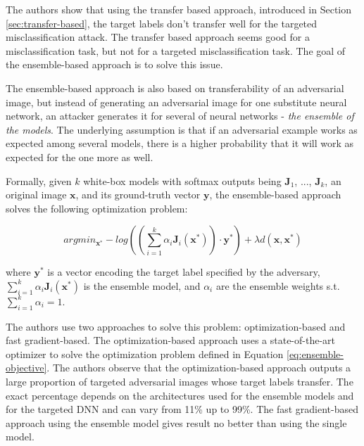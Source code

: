 The authors \cite{ensemble-attack} show that using the transfer based approach, introduced in Section \ref{sec:transfer-based}, the target labels don't transfer well for the targeted misclassification attack. The transfer based approach seems good for a misclassification task, but not for a targeted misclassification task. The goal of the ensemble-based approach is to solve this issue.

The ensemble-based approach is also based on transferability of an adversarial image, but instead of generating an adversarial image for one substitute neural network, an attacker generates it for several of neural networks - \textit{the ensemble of the models}. The underlying assumption is that if an adversarial example works as expected among several models, there is a higher probability that it will work as expected for the one more as well. 

Formally, given $k$ white-box models with softmax outputs being $\pmb J_1$, ..., $\pmb J_k$, an original image $\pmb x$, and its ground-truth vector $\pmb y$, the ensemble-based approach solves the following optimization problem:

\begin{equation}\label{eq:ensemble-objective}
argmin_{\pmb x^*} - log ((\sum_{i=1}^k \alpha_i \pmb J_i(\pmb x^*)) \cdot \pmb y^*) + \lambda d(\pmb x, \pmb x^*)
\end{equation}

where $\pmb y^*$ is a vector encoding the target label specified by the adversary, $\sum_{i=1}^k \alpha_i \pmb J_i(\pmb x^*)$ is the ensemble model, and $\alpha_i$ are the ensemble weights s.t. $\sum_{i=1}^k \alpha_i = 1$.

The authors use two approaches to solve this problem: optimization-based and fast gradient-based. The optimization-based approach uses a state-of-the-art optimizer to solve the optimization problem defined in Equation \ref{eq:ensemble-objective}. The authors observe that the optimization-based approach outputs a large proportion of targeted adversarial images whose target labels transfer. The exact percentage depends on the architectures used for the ensemble models and for the targeted DNN and can vary from 11\% up to 99\%. The fast gradient-based approach using the ensemble model gives result no better than using the single model.